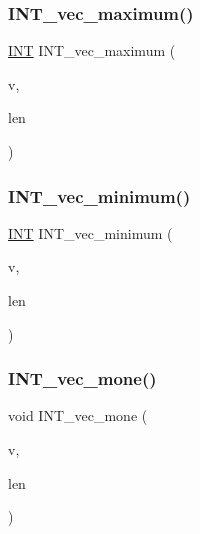 \mbox{\label{util_8_c_a4372bc8897f7d7504c02139508059368}} 
\subsubsection{\texorpdfstring{I\+N\+T\+\_\+vec\+\_\+maximum()}{INT\_vec\_maximum()}}
{\footnotesize\ttfamily \mbox{\hyperlink{galois_8h_a09fddde158a3a20bd2dcadb609de11dc}{I\+NT}} I\+N\+T\+\_\+vec\+\_\+maximum (\begin{DoxyParamCaption}\item[{\mbox{\hyperlink{galois_8h_a09fddde158a3a20bd2dcadb609de11dc}{I\+NT}} $\ast$}]{v,  }\item[{\mbox{\hyperlink{galois_8h_a09fddde158a3a20bd2dcadb609de11dc}{I\+NT}}}]{len }\end{DoxyParamCaption})}

\mbox{\label{util_8_c_ad664b58a4b27c2333107052bb4af13c5}} 
\subsubsection{\texorpdfstring{I\+N\+T\+\_\+vec\+\_\+minimum()}{INT\_vec\_minimum()}}
{\footnotesize\ttfamily \mbox{\hyperlink{galois_8h_a09fddde158a3a20bd2dcadb609de11dc}{I\+NT}} I\+N\+T\+\_\+vec\+\_\+minimum (\begin{DoxyParamCaption}\item[{\mbox{\hyperlink{galois_8h_a09fddde158a3a20bd2dcadb609de11dc}{I\+NT}} $\ast$}]{v,  }\item[{\mbox{\hyperlink{galois_8h_a09fddde158a3a20bd2dcadb609de11dc}{I\+NT}}}]{len }\end{DoxyParamCaption})}

\mbox{\label{util_8_c_a397bea975fe57fe81385ba156e33cfae}} 
\subsubsection{\texorpdfstring{I\+N\+T\+\_\+vec\+\_\+mone()}{INT\_vec\_mone()}}
{\footnotesize\ttfamily void I\+N\+T\+\_\+vec\+\_\+mone (\begin{DoxyParamCaption}\item[{\mbox{\hyperlink{galois_8h_a09fddde158a3a20bd2dcadb609de11dc}{I\+NT}} $\ast$}]{v,  }\item[{\mbox{\hyperlink{galois_8h_a09fddde158a3a20bd2dcadb609de11dc}{I\+NT}}}]{len }\end{DoxyParamCaption})}

